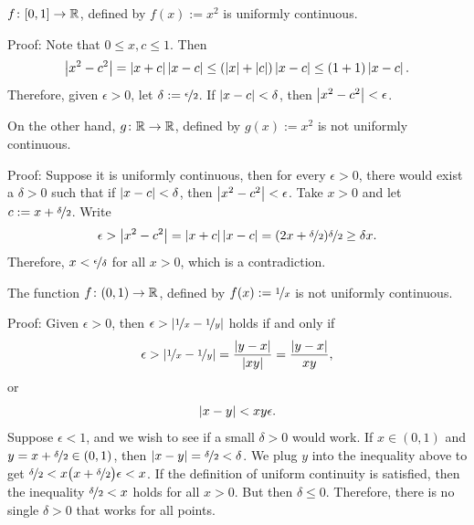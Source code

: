\begin{example}
$f \colon [0,1] \to {\mathbb{R}}$, defined by $f(x) := x^2$ is uniformly continuous.

Proof: Note that $0 \leq x,c \leq 1$.  Then
\begin{equation*}
\left\lvert {x^2-c^2} \right\rvert = \left\lvert {x+c} \right\rvert\left\lvert {x-c} \right\rvert
\leq (\left\lvert {x} \right\rvert+\left\lvert {c} \right\rvert) \left\lvert {x-c} \right\rvert
\leq (1+1)\left\lvert {x-c} \right\rvert .
\end{equation*}
Therefore, given $\epsilon > 0$, let $\delta := \nicefrac{\epsilon}{2}$.
If $\left\lvert {x-c} \right\rvert < \delta$, then $\left\lvert {x^2-c^2} \right\rvert < \epsilon$.

\medskip

On the other hand, $g \colon {\mathbb{R}} \to {\mathbb{R}}$, defined by $g(x) := x^2$ is not uniformly
continuous.

Proof: Suppose it is uniformly continuous, then for every $\epsilon > 0$,
there would exist a $\delta > 0$ such that
if $\left\lvert {x-c} \right\rvert < \delta$, then $\left\lvert {x^2 -c^2} \right\rvert < \epsilon$.
Take $x > 0$ and let
$c := x+\nicefrac{\delta}{2}$.  Write
\begin{equation*}
\epsilon >
\left\lvert {x^2-c^2} \right\rvert = \left\lvert {x+c} \right\rvert\left\lvert {x-c} \right\rvert
=
(2x+\nicefrac{\delta}{2})\nicefrac{\delta}{2} 
\geq 
\delta x .
\end{equation*}
Therefore, $x < \nicefrac{\epsilon}{\delta}$ for all $x > 0$, which is a
contradiction.
\end{example}


\begin{example}
The function $f \colon (0,1) \to {\mathbb{R}}$, defined by $f(x) := \nicefrac{1}{x}$ is not
uniformly continuous.

Proof: Given $\epsilon > 0$, then $\epsilon >
\left\lvert {\nicefrac{1}{x}-\nicefrac{1}{y}} \right\rvert$ holds if and only if
\begin{equation*}
\epsilon >
\left\lvert {\nicefrac{1}{x}-\nicefrac{1}{y}} \right\rvert
=
\frac{\left\lvert {y-x} \right\rvert}{\left\lvert {xy} \right\rvert} 
=
\frac{\left\lvert {y-x} \right\rvert}{xy} ,
\end{equation*}
or
\begin{equation*}
\left\lvert {x-y} \right\rvert < xy \epsilon .
\end{equation*}
Suppose $\epsilon < 1$, and we wish to see if a 
small $\delta > 0$ would work.
If $x \in (0,1)$ and 
$y = x+\nicefrac{\delta}{2} \in (0,1)$,
then $\left\lvert {x-y} \right\rvert = \nicefrac{\delta}{2} < \delta$.
We plug $y$ into the inequality above to get $\nicefrac{\delta}{2} <
x \bigl( x+\nicefrac{\delta}{2} \bigr) \epsilon < x$.
If the definition of uniform continuity is satisfied, then
the inequality $\nicefrac{\delta}{2} < x$ holds for all $x > 0$.   But then $\delta \leq 0$.
Therefore, there is no single $\delta > 0$ that works for all points.
\end{example}

